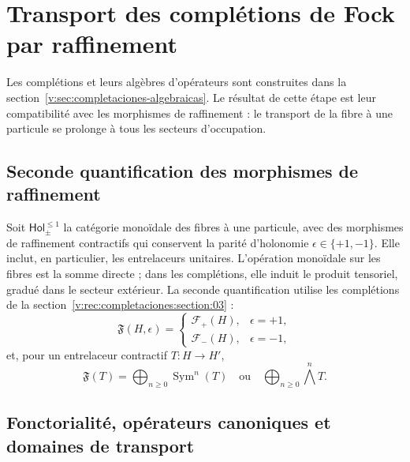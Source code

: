 \section{Transport des complétions de Fock par raffinement}
\label{v:rec:fock_gibbs:section:01}

Les complétions et leurs algèbres d’opérateurs sont construites dans la
section~\ref{v:sec:completaciones-algebraicas}. Le résultat de cette étape
est leur compatibilité avec les morphismes de raffinement : le transport de
la fibre à une particule se prolonge à tous les secteurs d’occupation.

\subsection{Seconde quantification des morphismes de raffinement}
\label{v:rec:fock_gibbs:section:02}

Soit \(\mathsf{Hol}_{\pm}^{\leq1}\) la catégorie monoïdale des fibres à une
particule, avec des morphismes de raffinement contractifs qui conservent la
parité d’holonomie \(\epsilon\in\{+1,-1\}\). Elle inclut, en particulier,
les entrelaceurs unitaires. L’opération monoïdale sur les fibres est
la somme directe ; dans les complétions, elle induit le produit tensoriel,
gradué dans le secteur extérieur. La seconde quantification utilise les
complétions de la section~\ref{v:rec:completaciones:section:03} :
\[
 \mathfrak F(H,\epsilon)=
 \begin{cases}
 \mathcal F_+(H),
     &\epsilon=+1,\\[2mm]
 \mathcal F_-(H),
     &\epsilon=-1,
 \end{cases}
\]
et, pour un entrelaceur contractif \(T:H\to H'\),
\[
 \mathfrak F(T)=
 \bigoplus_{n\ge0}\operatorname{Sym}^n(T)
 \quad\text{ou}\quad
 \bigoplus_{n\ge0}\bigwedge^n\!T.
\]

\subsection{Fonctorialité, opérateurs canoniques et domaines de transport}
\label{v:rec:fock_gibbs:section:03}

